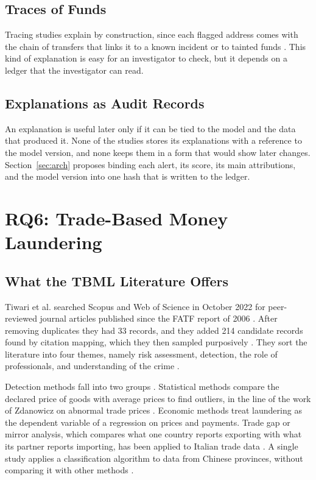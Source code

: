 \documentclass[journal]{IEEEtran}
\begin{document}
\subsection{Traces of Funds}

Tracing studies explain by construction, since each flagged address comes with the chain of transfers that links it to a known incident \cite{wu2024heists} or to tainted funds \cite{amber2026cbdc}. This kind of explanation is easy for an investigator to check, but it depends on a ledger that the investigator can read.

\subsection{Explanations as Audit Records}

An explanation is useful later only if it can be tied to the model and the data that produced it. None of the studies stores its explanations with a reference to the model version, and none keeps them in a form that would show later changes. Section~\ref{sec:arch} proposes binding each alert, its score, its main attributions, and the model version into one hash that is written to the ledger.

\section{RQ6: Trade-Based Money Laundering}
\label{sec:rq6}

\subsection{What the TBML Literature Offers}

Tiwari et al. searched Scopus and Web of Science in October 2022 for peer-reviewed journal articles published since the FATF report of 2006 \cite{tiwari2025tbml}. After removing duplicates they had 33 records, and they added 214 candidate records found by citation mapping, which they then sampled purposively \cite{tiwari2025tbml}. They sort the literature into four themes, namely risk assessment, detection, the role of professionals, and understanding of the crime \cite{tiwari2025tbml}.

Detection methods fall into two groups \cite{tiwari2025tbml}. Statistical methods compare the declared price of goods with average prices to find outliers, in the line of the work of Zdanowicz on abnormal trade prices \cite{zdanowicz2009}. Economic methods treat laundering as the dependent variable of a regression on prices and payments. Trade gap or mirror analysis, which compares what one country reports exporting with what its partner reports importing, has been applied to Italian trade data \cite{tiwari2025tbml}. A single study applies a classification algorithm to data from Chinese provinces, without comparing it with other methods \cite{tiwari2025tbml}.
\end{document}
